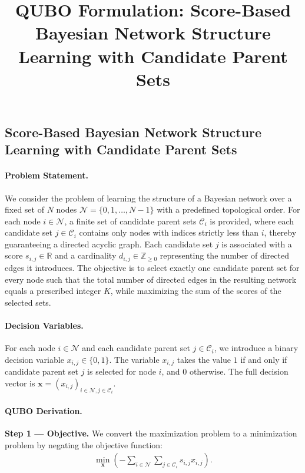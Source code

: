 \documentclass[12pt]{article}
\title{QUBO Formulation: Score-Based Bayesian Network Structure Learning with Candidate Parent Sets}
\date{}
\begin{document}
\maketitle

\subsection*{Score-Based Bayesian Network Structure Learning with Candidate Parent Sets}

\paragraph{Problem Statement.}
We consider the problem of learning the structure of a Bayesian network over a fixed set of $N$ nodes $\mathcal{N} = \{0, 1, \dots, N-1\}$ with a predefined topological order. For each node $i \in \mathcal{N}$, a finite set of candidate parent sets $\mathcal{C}_i$ is provided, where each candidate set $j \in \mathcal{C}_i$ contains only nodes with indices strictly less than $i$, thereby guaranteeing a directed acyclic graph. Each candidate set $j$ is associated with a score $s_{i,j} \in \mathbb{R}$ and a cardinality $d_{i,j} \in \mathbb{Z}_{\ge 0}$ representing the number of directed edges it introduces. The objective is to select exactly one candidate parent set for every node such that the total number of directed edges in the resulting network equals a prescribed integer $K$, while maximizing the sum of the scores of the selected sets.

\paragraph{Decision Variables.}
For each node $i \in \mathcal{N}$ and each candidate parent set $j \in \mathcal{C}_i$, we introduce a binary decision variable $x_{i,j} \in \{0,1\}$. The variable $x_{i,j}$ takes the value $1$ if and only if candidate parent set $j$ is selected for node $i$, and $0$ otherwise. The full decision vector is $\mathbf{x} = (x_{i,j})_{i \in \mathcal{N}, j \in \mathcal{C}_i}$.

\paragraph{QUBO Derivation.}
\textbf{Step 1 --- Objective.} We convert the maximization problem to a minimization problem by negating the objective function:
\begin{align}
    \min_{\mathbf{x}} \left( -\sum_{i \in \mathcal{N}} \sum_{j \in \mathcal{C}_i} s_{i,j} x_{i,j} \right).
\end{align}
\end{document}
